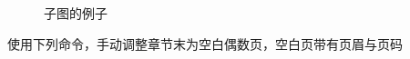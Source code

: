 \begin{figure}
    \centering
    \hspace{2em}
    \caption{子图的例子}
    \label{fig2}
\end{figure}

使用下列命令，手动调整章节末为空白偶数页，空白页带有页眉与页码
\clearpage
\phantom{s}
\clearpage

